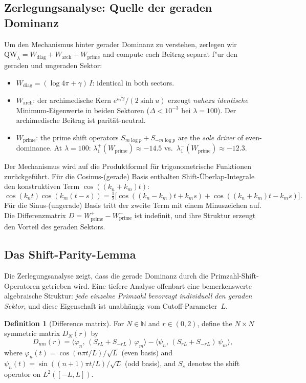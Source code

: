 \documentclass[12pt,a4paper]{article}
\theoremstyle{definition}
\newtheorem{definition}[theorem]{Definition}
\theoremstyle{remark}
\begin{document}
\subsection{Zerlegungsanalyse: Quelle der geraden Dominanz}

Um den Mechanismus hinter gerader Dominanz zu verstehen, zerlegen wir $\mathrm{QW}_\lambda = W_{\mathrm{diag}} + W_{\mathrm{arch}} + W_{\mathrm{prime}}$ and compute each Beitrag separat f"ur den geraden und ungeraden Sektor:

\begin{itemize}
  \item $W_{\mathrm{diag}} = (\log 4\pi + \gamma)\,I$: identical in both sectors.
  \item $W_{\mathrm{arch}}$: der archimedische Kern $e^{u/2}/(2\sinh u)$ erzeugt \emph{nahezu identische} Minimum-Eigenwerte in beiden Sektoren ($\Delta < 10^{-3}$ bei $\lambda = 100$). Der archimedische Beitrag ist parität-neutral.
  \item $W_{\mathrm{prime}}$: the prime shift operators $S_{m\log p} + S_{-m\log p}$ are the \emph{sole driver} of even-dominance. At $\lambda = 100$: $\lambda_1^+(W_{\mathrm{prime}}) \approx -14.5$ vs.\ $\lambda_1^-(W_{\mathrm{prime}}) \approx -12.3$.
\end{itemize}

Der Mechanismus wird auf die Produktformel für trigonometrische Funktionen zurückgeführt. Für die Cosinus-(gerade) Basis enthalten Shift-Überlap-Integrale den konstruktiven Term $\cos((k_n + k_m)t)$:
\[
  \cos(k_n t)\cos(k_m(t-s)) = \tfrac{1}{2}\bigl[\cos((k_n-k_m)t + k_m s) + \cos((k_n+k_m)t - k_m s)\bigr].
\]
Für die Sinus-(ungerade) Basis tritt der zweite Term mit einem Minuszeichen auf. Die Differenzmatrix $D = W_{\mathrm{prime}}^+ - W_{\mathrm{prime}}^-$ ist indefinit, und ihre Struktur erzeugt den Vorteil des geraden Sektors.

\subsection{Das Shift-Parity-Lemma}
\label{sec:shift-parity}

Die Zerlegungsanalyse zeigt, dass die gerade Dominanz durch die Primzahl-Shift-Operatoren getrieben wird. Eine tiefere Analyse offenbart eine bemerkenswerte algebraische Struktur: \emph{jede einzelne Primzahl bevorzugt individuell den geraden Sektor}, und diese Eigenschaft ist unabhängig vom Cutoff-Parameter~$L$.

\begin{definition}[Difference matrix]
\label{def:D-matrix}
For $N \in \mathbb{N}$ and $r \in (0,2)$, define the $N \times N$ symmetric matrix $D_N(r)$ by
\[
  D_{nm}(r) = \langle \varphi_n,\, (S_{rL} + S_{-rL})\,\varphi_m \rangle
            - \langle \psi_n,\, (S_{rL} + S_{-rL})\,\psi_m \rangle,
\]
where $\varphi_n(t) = \cos(n\pi t/L)/\sqrt{L}$ (even basis) and $\psi_n(t) = \sin((n+1)\pi t/L)/\sqrt{L}$ (odd basis), and $S_s$ denotes the shift operator on $L^2([-L,L])$.
\end{definition}
\end{document}
